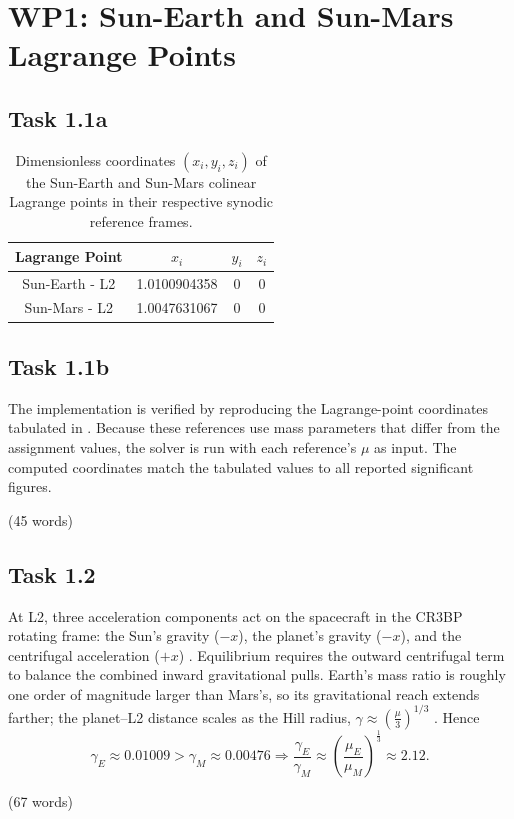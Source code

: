 \chapter{WP1: Sun-Earth and Sun-Mars Lagrange Points}
\label{chapter:wp1}

\section{Task 1.1a}

\begin{table}[H]
  \centering
  \caption{Dimensionless coordinates $(x_i, y_i, z_i)$ of the Sun-Earth and Sun-Mars colinear Lagrange points in their respective synodic reference frames.}
  \begin{tabular}{|c|c|c|c|}
  \hline
  \textbf{Lagrange Point} & $x_i$ & $y_i$ & $z_i$ \\
  \hline
  Sun-Earth - L2 & 1.0100904358 & 0 & 0 \\
  Sun-Mars  - L2 & 1.0047631067 & 0 & 0 \\
  \hline
\end{tabular}
\end{table}

\section{Task 1.1b}

The implementation is verified by reproducing the Lagrange-point coordinates tabulated in \textcite{wakker2015fundamentals,koon2000dynamical}. 
Because these references use mass parameters that differ from the assignment values, the solver is run with each reference's $\mu$ as input. 
The computed coordinates match the tabulated values to all reported significant figures. 

(45 words)

\section{Task 1.2}

At L2, three acceleration components act on the spacecraft in the CR3BP rotating frame: the Sun's gravity ($-x$), the planet's gravity ($-x$), and the centrifugal acceleration ($+x$) \parencite{wakker2015fundamentals,koon2000dynamical}. 
Equilibrium requires the outward centrifugal term to balance the combined inward gravitational pulls. 
Earth's mass ratio is roughly one order of magnitude larger than Mars's, so its gravitational reach extends farther; the planet--L2 distance scales as the Hill radius, $\gamma \approx \left(\frac{\mu}{3}\right)^{1/3}$ \parencite{szebehely1967theory}. %
Hence
\begin{equation}
  \gamma_E \approx 0.01009 > \gamma_M \approx 0.00476 \Rightarrow \frac{\gamma_E}{\gamma_M} \approx \left( \frac{\mu_E}{\mu_M} \right)^{\frac{1}{3}} \approx 2.12.
\end{equation} 

(67 words) %